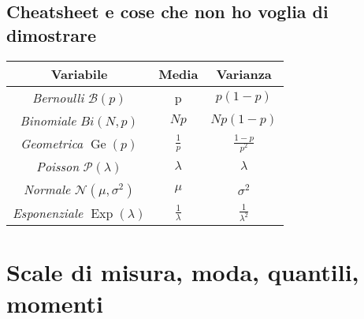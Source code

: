 \subsection{Cheatsheet e cose che non ho voglia di dimostrare}
\begin{table}[h!]
	\centering
	\begin{tabular}{|c c c|}
		\hline
		Variabile                                                         & Media                               & Varianza                               \\
		\hline
    \textit{Bernoulli} $ \mathcal{B} \left(p\right) $ & p & $ p \left(1-p\right) $ \\
		\textit{Binomiale} $ Bi\left(N, p\right) $                        & $ N p $                             & $ Np \left(1-p\right) $                \\
		\textit{Geometrica} $ \operatorname{Ge}\left(p\right) $            & $\displaystyle  \frac{1}{p} $       & $\displaystyle  \frac{1-p}{p^2 } $     \\
        \textit{Poisson} $ \mathcal{P} \left(\lambda \right) $ & $ \lambda  $ & $ \lambda $ \\
		\textit{Normale} $\displaystyle \mathcal{N} \left(\mu , \sigma ^2 \right) $ & $\displaystyle \mu  $               & $\displaystyle \sigma ^2  $             \\
    \textit{Esponenziale} $ \displaystyle   \operatorname{Exp}\left(\lambda \right) $  & $\displaystyle \frac{1}{\lambda } $ & $\displaystyle \frac{1}{\lambda ^2 } $ \\
		\hline
	\end{tabular}
\end{table}
\section{Scale di misura, moda, quantili, momenti}
